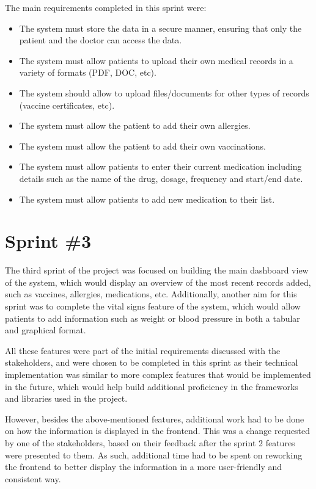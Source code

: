 The main requirements completed in this sprint were:

\begin{itemize}
    \item The system must store the data in a secure manner, ensuring that only the patient and the doctor can access the data.
    \item The system must allow patients to upload their own medical records in a variety of formats (PDF, DOC, etc).
    \item The system should allow to upload files/documents for other types of records (vaccine certificates, etc).
    \item The system must allow the patient to add their own allergies.
    \item The system must allow the patient to add their own vaccinations.
    \item The system must allow patients to enter their current medication including details such as the name of the drug, dosage, frequency and start/end date.
    \item The system must allow patients to add new medication to their list.
\end{itemize}

\section{Sprint \#3}

The third sprint of the project was focused on building the main dashboard view of the system, which would display an overview of the most recent records added, such as vaccines, allergies, medications, etc. Additionally, another aim for this sprint was to complete the vital signs feature of the system, which would allow patients to add information such as weight or blood pressure in both a tabular and graphical format. 

All these features were part of the initial requirements discussed with the stakeholders, and were chosen to be completed in this sprint as their technical implementation was similar to more complex features that would be implemented in the future, which would help build additional proficiency in the frameworks and libraries used in the project.

However, besides the above-mentioned features, additional work had to be done on how the information is displayed in the frontend. This was a change requested by one of the stakeholders, based on their feedback after the sprint 2 features were presented to them. As such, additional time had to be spent on reworking the frontend to better display the information in a more user-friendly and consistent way. 

